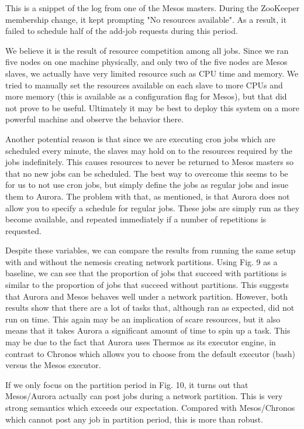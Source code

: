 \documentclass[letterpaper,twocolumn,10pt]{article}
\begin{document}
This is a snippet of the log from one of the Mesos masters. During the ZooKeeper membership change, it kept prompting "No resources available". As a result, it failed to schedule half of the add-job requests during this period.

We believe it is the result of resource competition among all jobs. Since we ran five nodes on one machine physically, and only two of the five nodes are Mesos slaves, we actually have very limited resource such as CPU time and memory. We tried to manually set the resources available on each slave to more CPUs and more memory (this is available as a configuration flag for Mesos), but that did not prove to be useful. Ultimately it may be best to deploy this system on a more powerful machine and observe the behavior there.

Another potential reason is that since we are executing cron jobs which are scheduled every minute, the slaves may hold on to the resources required by the jobs indefinitely. This causes resources to never be returned to Mesos masters so that no new jobs can be scheduled. The best way to overcome this seems to be for us to not use cron jobs, but simply define the jobs as regular jobs and issue them to Aurora. The problem with that, as mentioned, is that Aurora does not allow you to specify a schedule for regular jobs. These jobs are simply run as they become available, and repeated immediately if a number of repetitions is requested.

Despite these variables, we can compare the results from running the same setup with and without the nemesis creating network partitions. Using Fig. 9 as a baseline, we can see that the proportion of jobs that succeed with partitions is similar to the proportion of jobs that succeed without partitions. This suggests that Aurora and Mesos behaves well under a network partition. However, both results show that there are a lot of tasks that, although ran as expected, did not run on time. This again may be an implication of scare resources, but it also means that it takes Aurora a significant amount of time to spin up a task. This may be due to the fact that Aurora uses Thermos as its executor engine, in contrast to Chronos which allows you to choose from the default executor (bash) versus the Mesos executor. 

If we only focus on the partition period in Fig. 10, it turns out that Mesos/Aurora actually can post jobs during a network partition. This is very strong semantics which exceeds our expectation. Compared with Mesos/Chronos which cannot post any job in partition period, this is more than robust.
\end{document}
